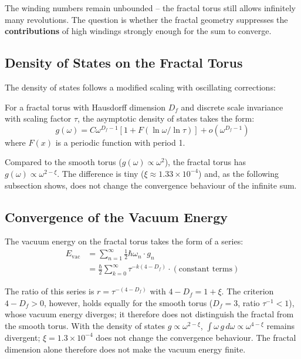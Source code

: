 	The winding numbers remain unbounded -- the fractal torus still allows infinitely many revolutions. The question is whether the fractal geometry suppresses the \textbf{contributions} of high windings strongly enough for the sum to converge.
	
	\subsection{Density of States on the Fractal Torus}
	
	The density of states follows a modified scaling with oscillating corrections:
	
	\begin{keypoint}
		For a fractal torus with Hausdorff dimension $D_f$ and discrete scale invariance with scaling factor $\tau$, the asymptotic density of states takes the form:
		\begin{equation}
			g(\omega) = C \omega^{D_f-1} \left[ 1 + F(\ln \omega / \ln \tau) \right] + o(\omega^{D_f-1})
			\label{eq:dos-fractal}
		\end{equation}
		where $F(x)$ is a periodic function with period 1.
	\end{keypoint}
	
	Compared to the smooth torus ($g(\omega) \propto \omega^2$), the fractal torus has $g(\omega) \propto \omega^{2-\xi}$. The difference is tiny ($\xi \approx 1.33 \times 10^{-4}$) and, as the following subsection shows, does not change the convergence behaviour of the infinite sum.
	
	\subsection{Convergence of the Vacuum Energy}
	
	The vacuum energy on the fractal torus takes the form of a series:
	\begin{align}
		E_{\text{vac}} &= \sum_{n=1}^{\infty} \frac{1}{2} \hbar \omega_n \cdot g_n \\
		&= \frac{\hbar}{2} \sum_{k=0}^{\infty} \tau^{-k(4-D_f)} \cdot (\text{constant terms})
	\end{align}
	
	The ratio of this series is $r = \tau^{-(4-D_f)}$ with $4 - D_f = 1 + \xi$. The criterion $4 - D_f > 0$, however, holds equally for the smooth torus ($D_f = 3$, ratio $\tau^{-1} < 1$), whose vacuum energy diverges; it therefore does not distinguish the fractal from the smooth torus. With the density of states $g \propto \omega^{2-\xi}$, $\int \omega\, g\, d\omega \propto \omega^{4-\xi}$ remains divergent; $\xi = 1.3\times10^{-4}$ does not change the convergence behaviour. The fractal dimension alone therefore does not make the vacuum energy finite.
	
